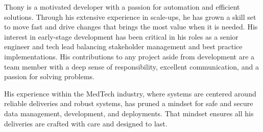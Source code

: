 %
%
%
\par{
Thony is a motivated developer with a passion for automation and efficient solutions. Through his extensive experience in scale-ups, he has grown a skill set to move fast and drive changes that brings the most value when it is needed. His interest in early-stage development has been critical in his roles as a senior engineer and tech lead balancing stakeholder management and best practice implementations. His contributions to any project aside from development are a team member with a deep sense of responsibility, excellent communication, and a passion for solving problems.

His experience within the MedTech industry, where systems are centered around reliable deliveries and robust systems, has pruned a mindset for safe and secure data management, development, and deployments. That mindset ensures all his deliveries are crafted with care and designed to last.
}